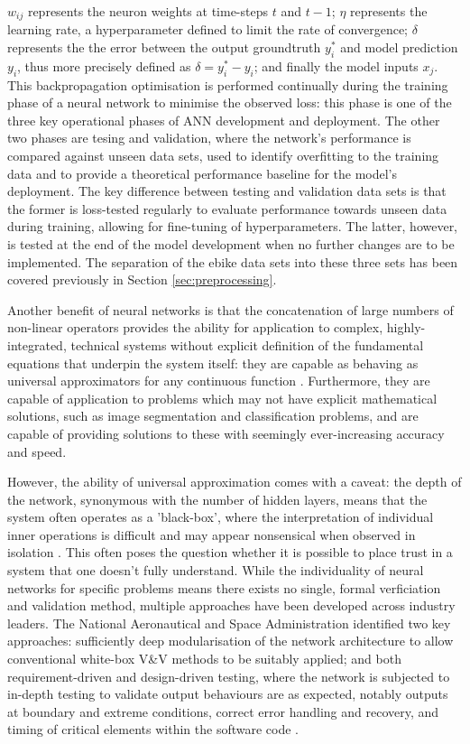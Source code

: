 \documentclass[a4paper, 10pt]{article}
\numberwithin{equation}{section}
\begin{document}
$w_{ij}$ represents the neuron weights at time-steps $t$ and $t-1$; $\eta$ represents the learning rate, a hyperparameter defined to limit the rate of convergence; $\delta$ represents the the error between the output groundtruth $y_i^*$ and model prediction $y_i$, thus more precisely defined as $\delta = y_i^* - y_i$; and finally the model inputs $x_j$. This backpropagation optimisation is performed continually during the training phase of a neural network to minimise the observed loss: this phase is one of the three key operational phases of ANN development and deployment. The other two phases are tesing and validation, where the network's performance is compared against unseen data sets, used to identify overfitting to the training data and to provide a theoretical performance baseline for the model's deployment. The key difference between testing and validation data sets is that the former is loss-tested regularly to evaluate performance towards unseen data during training, allowing for fine-tuning of hyperparameters. The latter, however, is tested at the end of the model development when no further changes are to be implemented. The separation of the ebike data sets into these three sets has been covered previously in Section \ref{sec:preprocessing}.

Another benefit of neural networks is that the concatenation of large numbers of non-linear operators provides the ability for application to complex, highly-integrated, technical systems without explicit definition of the fundamental equations that underpin the system itself: they are capable as behaving as universal approximators for any continuous function \cite{nn:universal}. Furthermore, they are capable of application to problems which may not have explicit mathematical solutions, such as image segmentation and classification problems, and are capable of providing solutions to these with seemingly ever-increasing accuracy and speed.\medbreak

However, the ability of universal approximation comes with a caveat: the depth of the network, synonymous with the number of hidden layers, means that the system often operates as a 'black-box', where the interpretation of individual inner operations is difficult and may appear nonsensical when observed in isolation \cite{nn:medical_blackbox_validation}. This often poses the question whether it is possible to place trust in a system that one doesn't fully understand. While the individuality of neural networks for specific problems means there exists no single, formal verficiation and validation method, multiple approaches have been developed across industry leaders. The National Aeronautical and Space Administration identified two key approaches: sufficiently deep modularisation of the network architecture to allow conventional white-box V\&V methods to be suitably applied; and both requirement-driven and design-driven testing, where the network is subjected to in-depth testing to validate output behaviours are as expected, notably outputs at boundary and extreme conditions, correct error handling and recovery, and timing of critical elements within the software code \cite{nn:nasa_blackbox_validation}.
\end{document}
